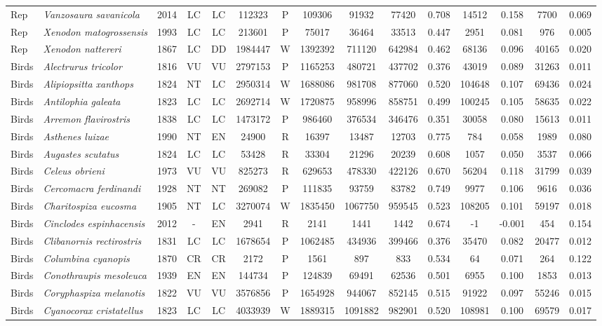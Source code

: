 \documentclass[12pt,openright,oneside,a4paper,english]{abntex2}
\begin{document}
\begin{landscape}
\begin{longtable}{llccccccccccccc}
		Rep&\textit{Vanzosaura savanicola}&2014&LC&LC&112323&P&109306&91932&77420&0.708&14512&0.158&7700&0.069\\
		Rep&\textit{Xenodon matogrossensis}&1993&LC&LC&213601&P&75017&36464&33513&0.447&2951&0.081&976&0.005\\
		Rep&\textit{Xenodon nattereri}&1867&LC&DD&1984447&W&1392392&711120&642984&0.462&68136&0.096&40165&0.020\\
		Birds&\textit{Alectrurus tricolor}&1816&VU&VU&2797153&P&1165253&480721&437702&0.376&43019&0.089&31263&0.011\\
		Birds&\textit{Alipiopsitta xanthops}&1824&NT&LC&2950314&W&1688086&981708&877060&0.520&104648&0.107&69436&0.024\\
		Birds&\textit{Antilophia galeata}&1823&LC&LC&2692714&W&1720875&958996&858751&0.499&100245&0.105&58635&0.022\\
		Birds&\textit{Arremon flavirostris}&1838&LC&LC&1473172&P&986460&376534&346476&0.351&30058&0.080&15613&0.011\\
		Birds&\textit{Asthenes luizae}&1990&NT&EN&24900&R&16397&13487&12703&0.775&784&0.058&1989&0.080\\
		Birds&\textit{Augastes scutatus}&1824&LC&LC&53428&R&33304&21296&20239&0.608&1057&0.050&3537&0.066\\
		Birds&\textit{Celeus obrieni}&1973&VU&VU&825273&R&629653&478330&422126&0.670&56204&0.118&31799&0.039\\
		Birds&\textit{Cercomacra ferdinandi}&1928&NT&NT&269082&P&111835&93759&83782&0.749&9977&0.106&9616&0.036\\
		Birds&\textit{Charitospiza eucosma}&1905&NT&LC&3270074&W&1835450&1067750&959545&0.523&108205&0.101&59197&0.018\\
		Birds&\textit{Cinclodes espinhacensis}&2012&-&EN&2941&R&2141&1441&1442&0.674&-1&-0.001&454&0.154\\
		Birds&\textit{Clibanornis rectirostris}&1831&LC&LC&1678654&P&1062485&434936&399466&0.376&35470&0.082&20477&0.012\\
		Birds&\textit{Columbina cyanopis}&1870&CR&CR&2172&P&1561&897&833&0.534&64&0.071&264&0.122\\
		Birds&\textit{Conothraupis mesoleuca}&1939&EN&EN&144734&P&124839&69491&62536&0.501&6955&0.100&1853&0.013\\
		Birds&\textit{Coryphaspiza melanotis}&1822&VU&VU&3576856&P&1654928&944067&852145&0.515&91922&0.097&55246&0.015\\
		Birds&\textit{Cyanocorax cristatellus}&1823&LC&LC&4033939&W&1889315&1091882&982901&0.520&108981&0.100&69579&0.017\\

\end{longtable}
\end{landscape}
\end{document}
